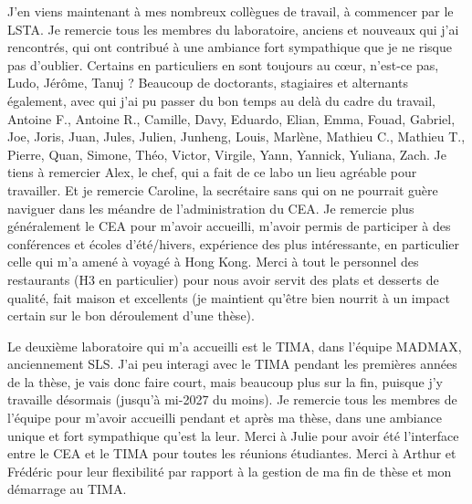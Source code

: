 J'en viens maintenant à mes nombreux collègues de travail, à commencer par le LSTA.
Je remercie tous les membres du laboratoire, anciens et nouveaux qui j'ai rencontrés, qui ont contribué à une ambiance fort sympathique que je ne risque pas d'oublier.
Certains en particuliers en sont toujours au c\oe{}ur, n'est-ce pas, Ludo, Jérôme, Tanuj ?
Beaucoup de doctorants, stagiaires et alternants également, avec qui j'ai pu passer du bon temps au delà du cadre du travail,
Antoine F.,
Antoine R.,
Camille,
Davy,
Eduardo,
Elian,
Emma,
Fouad,
Gabriel,
Joe,
Joris,
Juan,
Jules,
Julien,
Junheng,
Louis,
Marlène,
Mathieu C.,
Mathieu T.,
Pierre,
Quan,
Simone,
Théo,
Victor,
Virgile,
Yann,
Yannick,
Yuliana,
Zach.
Je tiens à remercier Alex, le chef, qui a fait de ce labo un lieu agréable pour travailler.
Et je remercie Caroline, la secrétaire sans qui on ne pourrait guère naviguer dans les méandre de l'administration du CEA.
Je remercie plus généralement le CEA pour m'avoir accueilli, m'avoir permis de participer à des conférences et écoles d'été/hivers, expérience des plus intéressante, en particulier celle qui m'a amené à voyagé à Hong Kong.
Merci à tout le personnel des restaurants (H3 en particulier) pour nous avoir servit des plats et desserts de qualité, fait maison et excellents (je maintient qu'être bien nourrit à un impact certain sur le bon déroulement d'une thèse).

\bigskip

Le deuxième laboratoire qui m'a accueilli est le TIMA, dans l'équipe MADMAX, anciennement SLS.
J'ai peu interagi avec le TIMA pendant les premières années de la thèse, je vais donc faire court, mais beaucoup plus sur la fin, puisque j'y travaille désormais (jusqu'à mi-2027 du moins).
Je remercie tous les membres de l'équipe pour m'avoir accueilli pendant et après ma thèse, dans une ambiance unique et fort sympathique qu'est la leur.
Merci à Julie pour avoir été l'interface entre le CEA et le TIMA pour toutes les réunions étudiantes.
Merci à Arthur et Frédéric pour leur flexibilité par rapport à la gestion de ma fin de thèse et mon démarrage au TIMA.

\bigskip

